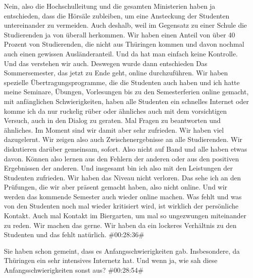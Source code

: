 \documentclass[a4paper, 12pt]{scrartcl}
\begin{document}
\begin{description}
\Andre Nein, also die Hochschulleitung und die gesamten Ministerien haben ja entschieden, dass die Hörsäle zubleiben, um eine Ansteckung der Studenten untereinander zu vermeiden. Auch deshalb, weil im Gegensatz zu einer Schule die Studierenden ja von überall herkommen. Wir haben einen Anteil von über 40 Prozent von Studierenden, die nicht aus Thüringen kommen und davon nochmal auch einen gewissen Ausländeranteil. Und da hat man einfach keine Kontrolle. Und das verstehen wir auch. Deswegen wurde dann entschieden Das Sommersemester, das jetzt zu Ende geht, online durchzuführen. Wir haben spezielle Übertragungsprogramme, die die Studenten auch haben und ich hatte meine Seminare, Übungen, Vorlesungen bis zu den Semesterferien online gemacht, mit anfänglichen Schwierigkeiten, haben alle Studenten ein schnelles Internet oder komme ich da nur ruckelig rüber oder ähnliches auch mit dem vorsichtigen Versuch, auch in den Dialog zu geraten. Mal Fragen zu beantworten und ähnliches. Im Moment sind wir damit aber sehr zufrieden. Wir haben viel dazugelernt. Wir zeigen also auch Zwischenergebnisse an alle Studierenden. Wir diskutieren darüber gemeinsam, sofort. Also nicht auf Band und alle haben etwas davon. Können also lernen aus den Fehlern der anderen oder aus den positiven Ergebnissen der anderen. Und insgesamt bin ich also mit den Leistungen der Studenten zufrieden. Wir haben das Niveau nicht verloren. Das sehe ich an den Prüfungen, die wir aber präsent gemacht haben, also nicht online. Und wir werden das kommende Semester auch wieder online machen. Was fehlt und was von den Studenten noch mal wieder kritisiert wird, ist wirklich der persönliche Kontakt. Auch mal Kontakt im Biergarten, um mal so ungezwungen miteinander zu reden. Wir machen das gerne. Wir haben da ein lockeres Verhältnis zu den Studenten und das fehlt natürlich. \#00:28:36\#

\Fabian Sie haben schon gemeint, dass es Anfangsschwierigkeiten gab. Insbesondere, da Thüringen ein sehr intensives Internetz hat. Und wenn ja, wie sah diese Anfangsschwierigkeiten sonst aus? \#00:28:54\#


\end{description}
\end{document}
